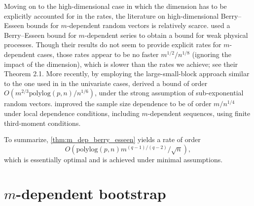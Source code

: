 \documentclass[aos]{imsart}
\begin{document}
 Moving on to the high-dimensional case in which the dimension has to be explicitly accounted for in the rates,
the literature on high-dimensional Berry--Esseen bounds for $m$-dependent random vectors is relatively scarce. \citet{zhang2018gaussian} used a Berry--Esseen bound for $m$-dependent series to obtain a bound for weak physical processes. Though their results do not seem to provide explicit rates for $m$-dependent cases, those rates appear to be no faster $m^{1/2}/n^{1/8}$ (ignoring the impact of the dimension), which is slower than the rates we achieve; see their Theorem 2.1. %
More recently, by employing the large-small-block approach similar to the one used in \citet{romano2000more} in the univariate cases, \citet[Section 2.1.2]{chang2021central} derived a bound of order $O({m^{2/3}\mathrm{polylog}(p,n)}/{n^{1/6}})$, under the strong assumption of %
sub-exponential random vectors. %
\citet[Theorem 1.4]{fang2021high} improved the sample size dependence to be of order $m / n^{1/4}$ under local dependence conditions, including $m$-dependent sequences, using finite third-moment conditions.


To summarize, \cref{thm:m_dep_berry_esseen} yields a  rate of order 
\[
O({\mathrm{polylog}(p,n)}{m^{(q-1)/(q-2)} / \sqrt{n}}),
\]
which is essentially optimal and is achieved under minimal assumptions. 








\section{\texorpdfstring{$m$}{m}-dependent bootstrap} \label{sec:m_dep_bootstrap}
\end{document}
